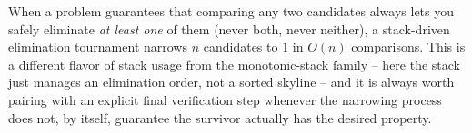 \begin{takeawaybox}
When a problem guarantees that comparing any two candidates always lets
you safely eliminate \emph{at least one} of them (never both, never
neither), a stack-driven elimination tournament narrows $n$ candidates
to $1$ in $O(n)$ comparisons. This is a different flavor of stack usage
from the monotonic-stack family -- here the stack just manages an
elimination order, not a sorted skyline -- and it is always worth pairing
with an explicit final verification step whenever the narrowing process
does not, by itself, guarantee the survivor actually has the desired
property.
\end{takeawaybox}
